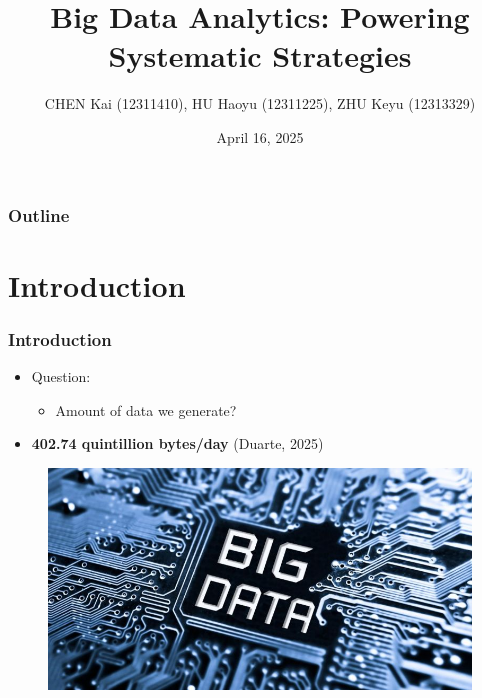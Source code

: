 \documentclass{beamer}
\title[Big Data Analytics]{Big Data Analytics: Powering Systematic Strategies}
\author[CHEN Kai,HU Haoyu,ZHU Keyu]{CHEN Kai (12311410), HU Haoyu (12311225), ZHU Keyu (12313329)}
\institute[SUSTech]{Southern University of Science and Technology}
\date{April 16, 2025}
\begin{document}
\begin{frame}
 \maketitle
\end{frame}



\begin{frame}
\frametitle{Outline}
 \tableofcontents
\end{frame}



\section{Introduction}
\begin{frame}
\frametitle{Introduction}
\begin{minipage}{\textwidth}
{\linespread{1.5}
\begin{itemize}
\setlength{\itemsep}{10pt}
    \item <1-> {\LARGE Question:} \\ 
    \begin{itemize}
        \item {\Large Amount of data we generate?}
    \end{itemize}
    \item <2-> {\LARGE \textbf{402.74 quintillion bytes/day}} (Duarte, 2025)
\end{itemize}
}
\begin{figure}
    \centering
    \includegraphics[width=0.5\linewidth]{figure 1.png}
    \label{fig:enter-label}
\end{figure}
\end{minipage}
\end{frame} 
\end{document}
